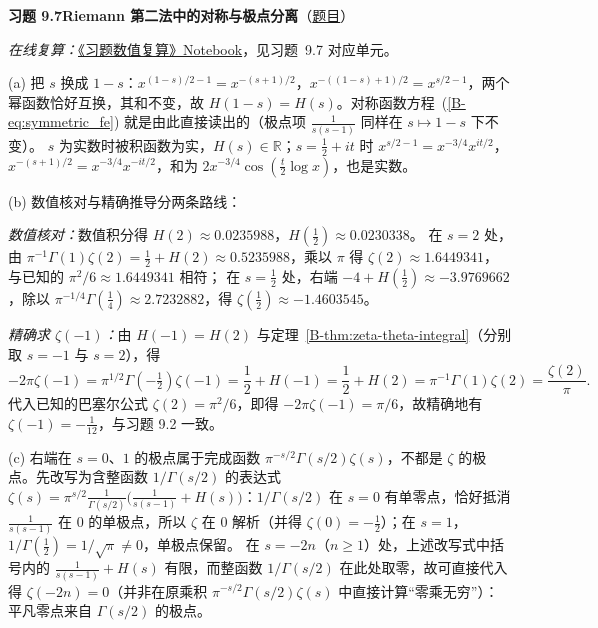 \documentclass[11pt,a4paper]{article}
\newcommand{\RR}{\mathbb{R}}
\newcommand{\bref}[1]{\ref*{B-#1}}
\newcommand{\Sol}[2]{%
  \par\addvspace{1.2em}\noindent
  \hypertarget{s:#1}{}\textbf{习题 #1\quad #2}\hfill{\small（\hyperlink{q:#1}{题目}）}\par
  \nopagebreak\smallskip}
\begin{document}
\Sol{9.7}{Riemann 第二法中的对称与极点分离}
\emph{在线复算：}\href{https://colab.research.google.com/github/lichengtong123/lichengtong-RH/blob/main/\%E4\%B9\%A0\%E9\%A2\%98\%E4\%B8\%8E\%E8\%A7\%A3\%E7\%AD\%94/\%E4\%B9\%A0\%E9\%A2\%98\%E6\%95\%B0\%E5\%80\%BC\%E5\%A4\%8D\%E7\%AE\%97.ipynb}{《习题数值复算》Notebook}，见习题~9.7 对应单元。

(a) 把 $s$ 换成 $1-s$：$x^{(1-s)/2-1}=x^{-(s+1)/2}$，$x^{-((1-s)+1)/2}=x^{s/2-1}$，两个幂函数恰好互换，其和不变，故 $H(1-s)=H(s)$。对称函数方程~(\bref{eq:symmetric_fe}) 就是由此直接读出的（极点项 $\frac1{s(s-1)}$ 同样在 $s\mapsto1-s$ 下不变）。
$s$ 为实数时被积函数为实，$H(s)\in\RR$；$s=\frac12+it$ 时 $x^{s/2-1}=x^{-3/4}x^{it/2}$，$x^{-(s+1)/2}=x^{-3/4}x^{-it/2}$，和为 $2x^{-3/4}\cos(\frac t2\log x)$，也是实数。

(b) 数值核对与精确推导分两条路线：

\emph{数值核对：}数值积分得 $H(2)\approx0.0235988$，$H(\tfrac12)\approx0.0230338$。
在 $s=2$ 处，由 $\pi^{-1}\Gamma(1)\zeta(2)=\tfrac12+H(2)\approx0.5235988$，乘以 $\pi$ 得 $\zeta(2)\approx1.6449341$，与已知的 $\pi^2/6\approx1.6449341$ 相符；
在 $s=\frac12$ 处，右端 $-4+H(\tfrac12)\approx-3.9769662$，除以 $\pi^{-1/4}\Gamma(\tfrac14)\approx2.7232882$，得 $\zeta(\tfrac12)\approx-1.4603545$。

\emph{精确求 $\zeta(-1)$：}由 $H(-1)=H(2)$ 与定理~\bref{thm:zeta-theta-integral}（分别取 $s=-1$ 与 $s=2$），得
\[
  -2\pi\zeta(-1)=\pi^{1/2}\Gamma(-\tfrac12)\zeta(-1)=\frac12+H(-1)=\frac12+H(2)=\pi^{-1}\Gamma(1)\zeta(2)=\frac{\zeta(2)}{\pi}.
\]
代入已知的巴塞尔公式 $\zeta(2)=\pi^2/6$，即得 $-2\pi\zeta(-1)=\pi/6$，故精确地有 $\zeta(-1)=-\frac1{12}$，与习题 9.2 一致。

(c) 右端在 $s=0$、$1$ 的极点属于完成函数 $\pi^{-s/2}\Gamma(s/2)\zeta(s)$，不都是 $\zeta$ 的极点。先改写为含整函数 $1/\Gamma(s/2)$ 的表达式 $\zeta(s)=\pi^{s/2}\frac1{\Gamma(s/2)}\bigl(\frac1{s(s-1)}+H(s)\bigr)$：$1/\Gamma(s/2)$ 在 $s=0$ 有单零点，恰好抵消 $\frac1{s(s-1)}$ 在 $0$ 的单极点，所以 $\zeta$ 在 $0$ 解析（并得 $\zeta(0)=-\frac12$）；在 $s=1$，$1/\Gamma(\frac12)=1/\sqrt\pi\ne0$，单极点保留。
在 $s=-2n$（$n\ge1$）处，上述改写式中括号内的 $\frac1{s(s-1)}+H(s)$ 有限，而整函数 $1/\Gamma(s/2)$ 在此处取零，故可直接代入得 $\zeta(-2n)=0$（并非在原乘积 $\pi^{-s/2}\Gamma(s/2)\zeta(s)$ 中直接计算“零乘无穷”）：平凡零点来自 $\Gamma(s/2)$ 的极点。
\end{document}
